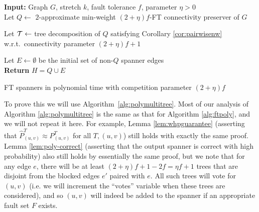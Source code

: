 \begin{algorithm}[t]
\DontPrintSemicolon

\textbf{Input:} Graph $G$, stretch $k$, fault tolerance $f$, parameter $\eta > 0$\;~\\

Let $Q \gets $ $2$-approximate min-weight $(2+\eta)f$-FT connectivity preserver of $G$ 

Let $\mathcal{T} \gets$ tree decomposition of $Q$ satisfying Corollary \ref{cor:pairwisenw} w.r.t.\ connectivity parameter $(2+\eta)f+1$\;

Let $E \gets \emptyset$ be the initial set of non-$Q$ spanner edges\;~\\

\textbf{Return} $H = Q \cup E$\;
\caption{\label{alg:polymultitree} FT spanners in polynomial time with competition parameter $(2+\eta)f$}
\end{algorithm}


To prove this we will use Algorithm~\ref{alg:polymultitree}.  Most of our analysis of Algorithm \ref{alg:polymultitree} is the same as that for Algorithm \ref{alg:ftpoly}, and we will not repeat it here.
For example, Lemma \ref{lem:whpguarantee} (asserting that $\widehat{P}^T_{(u , v)} \approx P^T_{(u, v)}$ for all $T, (u, v)$) still holds with exactly the same proof.
Lemma \ref{lem:poly-correct} (asserting that the output spanner is correct with high probability) also still holds by essentially the same proof, but we note that for any edge $e$, there will be at least $(2+\eta)f+1 - 2f = \eta f + 1$ trees that are disjoint from the blocked edges $e'$ paired with $e$.
All such trees will vote for $(u, v)$ (i.e. we will increment the ``votes'' variable when these trees are considered), and so $(u, v)$ will indeed be added to the spanner if an appropriate fault set $F$ exists.

